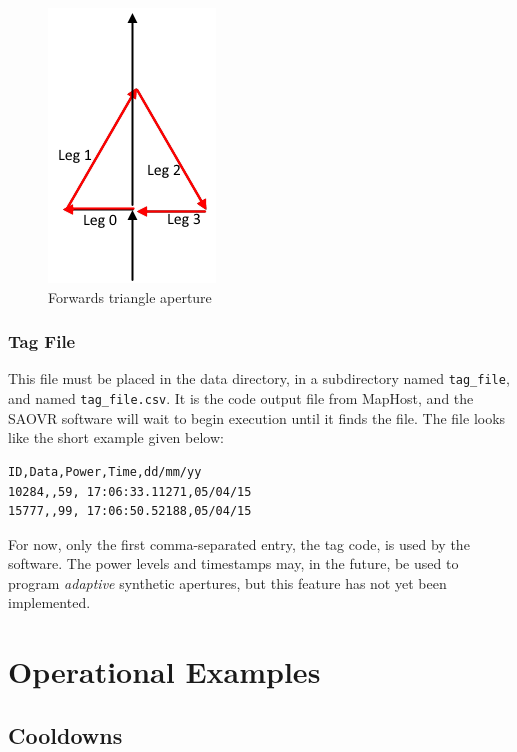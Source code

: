 \documentclass[11pt]{article} %
\begin{document}
\begin{figure}[t]
\centering
\includegraphics{img/fwd_triangle.png}
\caption{Forwards triangle aperture}
\label{fig:fwd_triangle}
\end{figure}

\subsubsection*{Tag File}
\label{sec:tagfile}

This file must be placed in the data directory, in a subdirectory named \mbox{\texttt{tag\_file}}, and named \mbox{\texttt{tag\_file.csv}}. It is the code 
output file from MapHost, and the SAOVR software will wait to begin execution until it finds the file. The file looks like the short example given below:

\begin{Verbatim}[xleftmargin=.5in,fontsize=\small,frame=single]
ID,Data,Power,Time,dd/mm/yy
10284,,59, 17:06:33.11271,05/04/15
15777,,99, 17:06:50.52188,05/04/15
\end{Verbatim}

For now, only the first comma-separated entry, the tag code, is used by the software. The power levels and timestamps may, in the future, be used to
program \emph{adaptive} synthetic apertures, but this feature has not yet been implemented.





\section{Operational Examples}
\subsection{Cooldowns}
\label{sec:cooldown_example}
\end{document}
